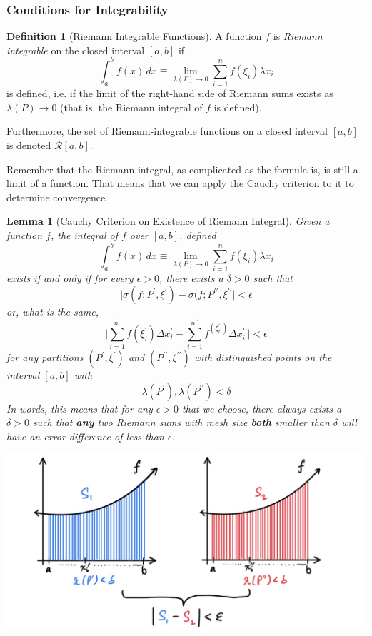 \documentclass{article}
\newtheorem{lemma}[theorem]{Lemma}
\theoremstyle{remark}
\theoremstyle{definition}
\newtheorem{definition}{Definition}[section]
\begin{document}
\subsubsection{Conditions for Integrability}

\begin{definition}[Riemann Integrable Functions]
A function $f$ is \textit{Riemann integrable} on the closed interval $[a, b]$ if 
\[\int_a^b f(x)\,dx \equiv \lim_{\lambda(P) \rightarrow 0} \sum_{i=1}^n f(\xi_i) \lambda x_i\]
is defined, i.e. if the limit of the right-hand side of Riemann sums exists as $\lambda(P) \rightarrow 0$ (that is, the Riemann integral of $f$ is defined). 

Furthermore, the set of Riemann-integrable functions on a closed interval $[a, b]$ is denoted $\mathcal{R}[a,b]$. 
\end{definition}

Remember that the Riemann integral, as complicated as the formula is, is still a limit of a function. That means that we can apply the Cauchy criterion to it to determine convergence. 

\begin{lemma}[Cauchy Criterion on Existence of Riemann Integral]
Given a function $f$, the integral of $f$ over $[a, b]$, defined
\[\int_a^b f(x)\,dx \equiv \lim_{\lambda(P) \rightarrow 0} \sum_{i=1}^n f(\xi_i) \lambda x_i\]
exists if and only if for every $\epsilon>0$, there exists a $\delta>0$ such that 
\[\big| \sigma(f; P^\prime, \xi^\prime) - \sigma(f; P^{\prime\prime}, \xi^{\prime\prime} \big| < \epsilon\]
or, what is the same, 
\[\Bigg| \sum_{i=1}^{n^\prime} f(\xi_i^\prime) \Delta x_i^\prime - \sum_{i=1}^{n^{\prime\prime}} f^(\xi_i^{\prime\prime}) \Delta x_i^{\prime\prime} \Bigg| < \epsilon\]
for any partitions $(P^\prime, \xi^\prime)$ and $(P^{\prime\prime}, \xi^{\prime\prime})$ with distinguished points on the interval $[a, b]$ with
\[\lambda(P^\prime), \lambda(P^{\prime\prime}) < \delta\]
In words, this means that for any $\epsilon>0$ that we choose, there always exists a $\delta>0$ such that \textbf{any} two Riemann sums with mesh size \textbf{both} smaller than $\delta$ will have an error difference of less than $\epsilon$. \begin{center}
    \includegraphics[scale=0.3]{img/Cauchy_Criterion_of_Riemann_Integral.jpg}
\end{center}
\end{lemma}
\end{document}
